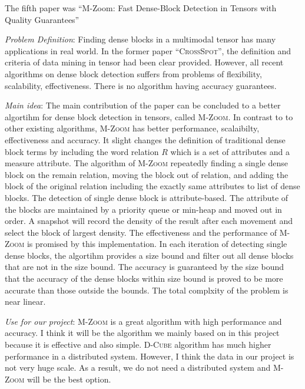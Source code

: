 \newpage
The fifth paper was ``M-Zoom: Fast Dense-Block Detection in Tensors with Quality Guarantees''

\begin{itemize*}
\item {\em Problem Definition}: Finding dense blocks in a multimodal tensor has many applications in real world. In the former paper ``\textsc{CrossSpot}'', the definition and criteria  of data mining in tensor had been clear provided. However, all recent algorithms on dense block detection suffers from problems of flexibility, scalability, effectiveness. There is no algorithm having accuracy guarantees.\\

\item {\em Main idea}: The main contribution of the paper can be concluded to a better algortihm for dense block detection in tensors, called \textsc{M-Zoom}. In contrast to to other existing algorithms, \textsc{M-Zoom} has better performance, scalaibilty, effectiveness and accuracy. It slight changes the definition of traditional dense block terms by including the word relation $R$ which is a set of attributes and a measure attribute. The algorithm of \textsc{M-Zoom} repeatedly finding a single dense block on the remain relation, moving the block out of relation, and adding the block of the original relation including the exactly same attributes to list of dense blocks. The detection of single dense block is attribute-based. The attribute of the blocks are maintained by a priority queue or min-heap and moved out in order. A snapshot will record the density of the result after each movement and select the block of largest density. The effectiveness and the performance of \textsc{M-Zoom} is promised by this implementation. In each iteration of detecting single dense blocks, the algortihm provides a size bound and filter out all dense blocks that are not in the size bound. The accuracy is guaranteed by the size bound that the accuracy of the dense blocks within size bound is proved to be more accurate than those outside the bounds. The total complxity of the problem is near linear.\\

\item {\em Use for our project}:
      \textsc{M-Zoom} is a great algorithm with high performance and accuracy. I think it will be the algorithm we mainly based on in this project because it is effective and also simple. \textsc{D-Cube} algorithm has much higher performance in a distributed system. However, I think the data in our project is not very huge scale. As a result, we do not need a distributed system and \textsc{M-Zoom} will be the best option. \\
      

\end{itemize*}
